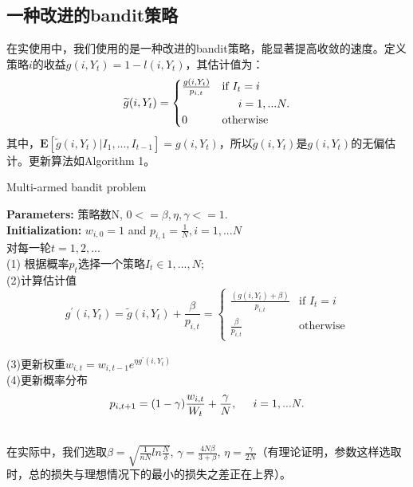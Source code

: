 \subsection{一种改进的bandit策略}
在实使用中，我们使用的是一种改进的bandit策略，能显著提高收敛的速度。定义策略$i$的收益$g(i, Y_t) = 1-l(i, Y_t)$，其估计值为：
$$
\widetilde{g}(i, Y_t) = 
\begin{cases}
\frac{g(i,Y_{t})}{p_{i,t}}& \text{if } I_t = i  \\  &  \hspace*{0.2in} i=1,...N. \\ 
0& \text{otherwise} 
\end{cases}
$$
其中，$\mathbf{E}[\widetilde{g}(i, Y_t) |I_1,...,I_{t-1}] = g(i, Y_t)$，所以$\widetilde{g}(i, Y_t) $是$g(i, Y_t)$的无偏估计。更新算法如Algorithm 1。
\begin{algorithm}[t]
\caption{Multi-armed bandit problem} %
\hspace*{0.02in} {\bf Parameters:} 
策略数N, $0<=\beta, \eta, \gamma <= 1$. \\
\hspace*{0.02in} {\bf Initialization:} %
$w_{i,0}=1$ and $p_{i,1} = \frac{1}{N}, i=1,...N$ \\
\hspace*{0.02in} {对每一轮$t=1,2,...$} \\ %
\hspace*{0.2in} {(1) 根据概率$p_t$选择一个策略$I_{t} \in {1,...,N}$}; \\
\hspace*{0.2in} {(2)计算估计值} \\
\hspace*{2in} {
$$
g^{'}(i, Y_t) = \widetilde{g}(i, Y_t) + \frac{\beta}{p_{i,t}} = 
\begin{cases}
\frac{(g(i, Y_t) + \beta)}{p_{i,t}}& \text{if } I_t = i  \\  
\frac{\beta}{p_{i,t}}& \text{otherwise} 
\end{cases}
$$
} \\
\hspace*{0.2in} {(3)更新权重$w_{i,t} = w_{i, t-1}e^{\eta{g^{'}(i,Y_t)}}$} \\
\hspace*{0.2in} {(4)更新概率分布} \\
\hspace*{2in} {
$$
p_{i, t+1} = (1-\gamma)\frac{w_{i,t}}{W_t} + \frac{\gamma}{N}, \hspace*{0.2in}  i=1,...N.
$$
}
\end{algorithm} \\
在实际中，我们选取$\beta=\sqrt{\frac{1}{nN}ln\frac{N}{\delta}}$, $\gamma=\frac{4N\beta}{3+\beta}$, $\eta=\frac{\gamma}{2N}$（有理论证明，参数这样选取时，总的损失与理想情况下的最小的损失之差正在上界）。\\

